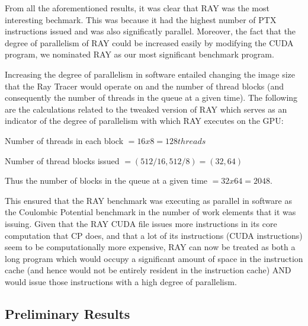 From all the aforementioned results, it was clear that RAY was the most interesting bechmark. This was because it had the highest number of PTX instructions issued and was also significatly parallel. Moreover, the fact that the degree of parallelism of RAY could be increased easily by modifying the CUDA program, we nominated RAY as our most significant benchmark program. 

Increasing the degree of parallelism in software entailed changing the image size that the Ray Tracer would operate on and the number of thread blocks (and consequently the number of threads in the queue at a given time). The following are the calculations related to the tweaked version of RAY which serves as an indicator of the degree of parallelism with which RAY executes on the GPU:

Number of threads in each block $= 16 x 8 = 128 threads$

Number of thread blocks issued $= (512/16, 512/8) = (32, 64)$

Thus the number of blocks in the queue at a given time $= 32 x 64 = 2048.$

This ensured that the RAY benchmark was executing as parallel in software as the Coulombic Potential benchmark in the number of work elements that it was issuing. Given that the RAY CUDA file issues more instructions in its core computation that CP does, and that a lot of its instructions (CUDA instructions) seem to be computationally more expensive, RAY can now be treated as both a long program which would occupy a significant amount of space in the instruction cache (and hence would not be entirely resident in the instruction cache) AND would issue those instructions with a high degree of parallelism.

\subsection{Preliminary Results}

